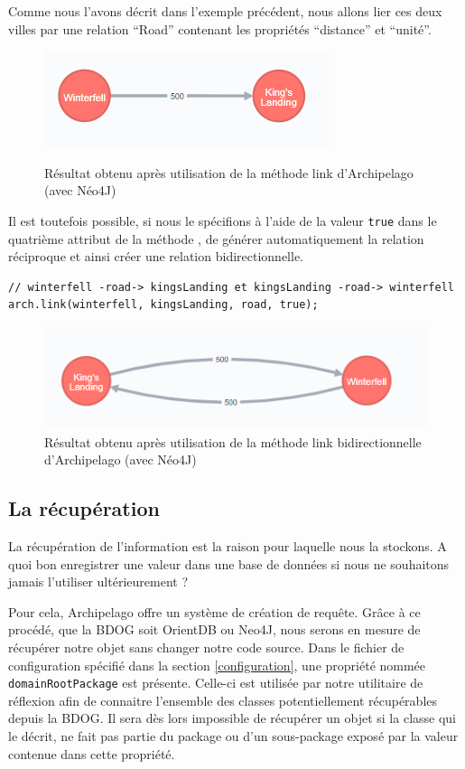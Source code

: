 \documentclass[a4paper,fleqn,12pt,oneside]{report}
\begin{document}
Comme nous l'avons décrit dans l'exemple précédent, nous allons lier ces deux villes par une relation \enquote{Road} contenant les propriétés \enquote{distance} et \enquote{unité}.

\begin{figure}[!ht]
\centering
\includegraphics[scale=1.2]{figures/Rel.png}
\label{fig:Relation}
\caption{Résultat obtenu après utilisation de la méthode link d'Archipelago (avec Néo4J)}
\end{figure}

Il est toutefois possible, si nous le spécifions à l'aide de la valeur \texttt{true} dans le quatrième attribut de la méthode , de générer automatiquement la relation réciproque et ainsi créer une relation bidirectionnelle. 

\begin{lstlisting}
// winterfell -road-> kingsLanding et kingsLanding -road-> winterfell
arch.link(winterfell, kingsLanding, road, true);
\end{lstlisting}


\begin{figure}[!ht]
\centering
\includegraphics[scale=1.2]{figures/RelBidir.png}
\caption{Résultat obtenu après utilisation de la méthode link bidirectionnelle d'Archipelago (avec Néo4J)}
\label{fig:RelationBiDir}
\end{figure}
\newpage
\subsection{La récupération}

La récupération de l'information est la raison pour laquelle nous la stockons. A quoi bon enregistrer une valeur dans une base de données si nous ne souhaitons jamais l'utiliser ultérieurement ?

Pour cela, Archipelago offre un système de création de requête. Grâce à ce procédé, que la BDOG soit OrientDB ou Neo4J, nous serons en mesure de récupérer notre objet sans changer notre code source. Dans le fichier de configuration spécifié dans la section \ref{configuration}, une propriété nommée \texttt{domainRootPackage} est présente. Celle-ci est utilisée par notre utilitaire de réflexion afin de connaitre l'ensemble des classes potentiellement récupérables depuis la BDOG. Il sera dès lors impossible de récupérer un objet si la classe qui le décrit, ne fait pas partie du package ou d'un sous-package exposé par la valeur contenue dans cette propriété.
\end{document}
